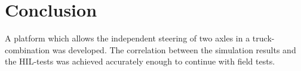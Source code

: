 \documentclass[root.tex]{subfiles}
\begin{document}
{\pagestyle{empty}}
\section{Conclusion}
\label{chap:Conclusion}

A platform which allows the independent steering of two axles in a truck-combination was developed. The correlation between the simulation results and the \gls{HIL}-tests was achieved accurately enough to continue with field tests. 
\end{document}
